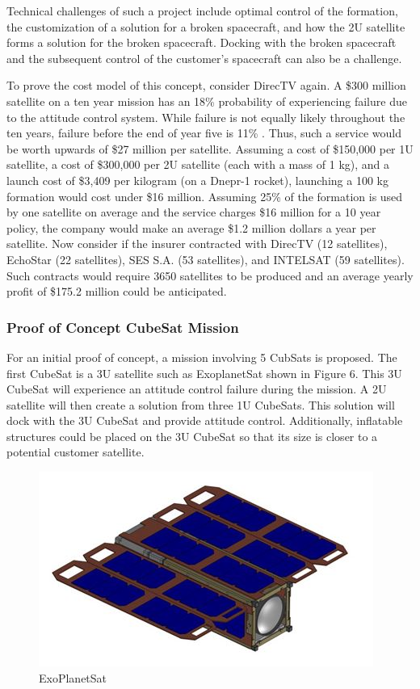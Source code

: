 Technical challenges of such a project include optimal control of the formation, the customization of a solution for a broken spacecraft, and how the 2U satellite forms a solution for the broken spacecraft. Docking with the broken spacecraft and the subsequent control of the customer's spacecraft can also be a challenge.

To prove the cost model of this concept, consider DirecTV again. A \$300 million satellite on a ten year mission has an 18\% probability of experiencing failure due to the attitude control system. While failure is not equally likely throughout the ten years, failure before the end of year five is 11\% \cite{SMAD}. Thus, such a service would be worth upwards of \$27 million per satellite. Assuming a cost of \$150,000 per 1U satellite, a cost of \$300,000 per 2U satellite (each with a mass of 1 kg), and a launch cost of \$3,409 per kilogram (on a Dnepr-1 rocket), launching a 100 kg formation would cost under \$16 million. Assuming 25\% of the formation is used by one satellite on average and the service charges \$16 million for a 10 year policy, the company would make an average \$1.2 million dollars a year per satellite. Now consider if the insurer contracted with DirecTV (12 satellites), EchoStar (22 satellites), SES S.A. (53 satellites), and INTELSAT (59 satellites). Such contracts would require 3650 satellites to be produced and an average yearly profit of \$175.2 million could be anticipated. 

\subsubsection{Proof of Concept CubeSat Mission}
For an initial proof of concept, a mission involving 5 CubSats is proposed. The first CubeSat is a 3U satellite such as ExoplanetSat shown in Figure 6. This 3U CubeSat will experience an attitude control failure during the mission. A 2U satellite will then create a solution from three 1U CubeSats. This solution will dock with the 3U CubeSat and provide attitude control. Additionally, inflatable structures could be placed on the 3U CubeSat so that its size is closer to a potential customer satellite.

\begin{figure}[!h]
\centering
\includegraphics[scale=0.75]{ExoPlanetSat.jpg}
\caption{ExoPlanetSat \cite{MIT}}
\end{figure}




